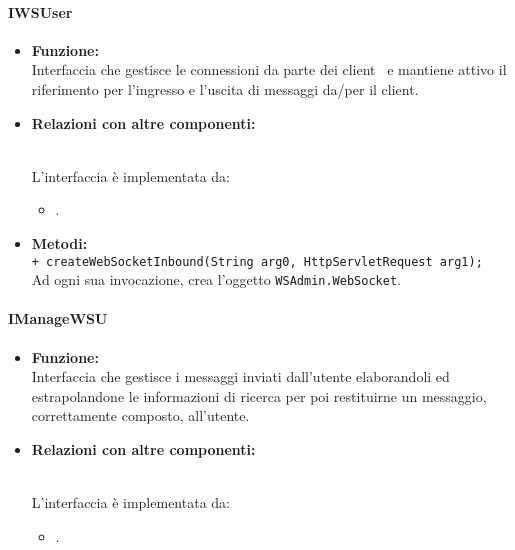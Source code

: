 {{\begin{sloppypar}
{{	
		\paragraph{IWSUser}\label{par:IWSUser}{
		\begin{itemize}
			\item[] \textbf{Funzione:}\\
					Interfaccia che gestisce le connessioni da parte dei client\g~ e mantiene attivo il riferimento per l'ingresso e l'uscita di messaggi da/per il client\g.\\
			
			\item[] \textbf{Relazioni con altre componenti:}{\\
				L'interfaccia è implementata da:
				\begin{itemize}
					\item[]	.\\
				\end{itemize}
				}

			\item[] \textbf{Metodi:}{ \\
				\texttt{+ createWebSocketInbound(String arg0, HttpServletRequest arg1);}\\
				Ad ogni sua invocazione, crea l'oggetto \texttt{WSAdmin.WebSocket}.\\
			}
			\end{itemize}
		}
		
		

		\paragraph{IManageWSU}\label{par:IManageWSU}{
			\begin{itemize}
			\item[] \textbf{Funzione:}{\\
				Interfaccia che gestisce i messaggi inviati dall'utente elaborandoli ed estrapolandone le informazioni di ricerca per poi restituirne un messaggio, correttamente composto, all'utente.\\
				}
			
			\item[] \textbf{Relazioni con altre componenti:}{\\
				L'interfaccia è implementata da:
				\begin{itemize}
				 	\item[]	.\\
				\end{itemize}
				}
			

\end{itemize}}}}
\end{sloppypar}}}
